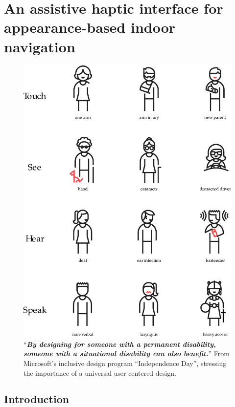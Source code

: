 \chapter{An assistive haptic interface for appearance-based indoor navigation}\label{ch:chapter6}


\begin{figure}[h]
\centering
\includegraphics[scale=0.5]{gfx/Chapter06/inclusive_design.pdf}
\caption{``\textit{\textbf{By designing for someone with a permanent disability, someone with a situational disability can also benefit.}}'' From Microsoft's inclusive design program ``Independence Day'', stressing the importance of a universal user centered design.}
\label{fig:microsoft_inclusive_design}
\end{figure}

\section{Introduction}
\label{sec:Intro}

